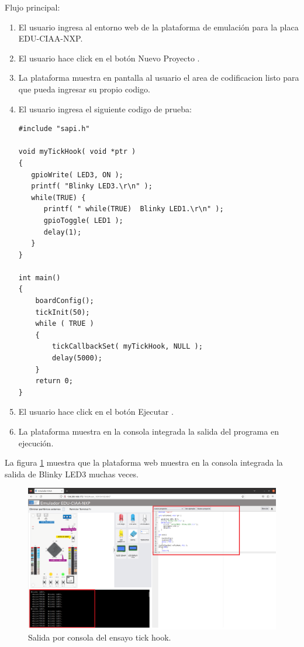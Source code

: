 Flujo principal:
\begin{enumerate}
	\item El usuario ingresa al entorno web de la plataforma de emulación para la placa EDU-CIAA-NXP.
	\item El usuario hace click en el botón \textquotedbl Nuevo Proyecto \textquotedbl.
	\item La plataforma muestra en pantalla al usuario el area de codificacion listo para que pueda ingresar su propio codigo.
	\item El usuario ingresa el siguiente codigo de prueba:
	
\begin{lstlisting}[caption={nuevo proyecto}]
#include "sapi.h"

void myTickHook( void *ptr )
{
   gpioWrite( LED3, ON );
   printf( "Blinky LED3.\r\n" );
   while(TRUE) {
      printf( " while(TRUE)  Blinky LED1.\r\n" );
      gpioToggle( LED1 );
      delay(1);
   }
}

int main()
{
    boardConfig();
    tickInit(50);
    while ( TRUE )
    {
		tickCallbackSet( myTickHook, NULL );
		delay(5000);
    }
    return 0;
}
\end{lstlisting}

	\item El usuario hace click en el botón \textquotedbl Ejecutar \textquotedbl.
	\item La plataforma muestra en la consola integrada la salida del programa en ejecución.
	
\end{enumerate}
	

La figura \ref{fig:Testtickhook} muestra que la plataforma web muestra en la consola integrada la salida de \textquotedbl Blinky LED3 \textquotedbl muchas veces. 

\hfill \break
\hfill \break
\hfill \break
\hfill \break
\hfill \break
\hfill \break
\hfill \break
\hfill \break
\hfill \break
\hfill \break
\hfill \break

\begin{figure}[ht]
	\centering
	\includegraphics[scale=.25]{./Figures/Testtickhook.png}
	\caption{Salida por consola del ensayo tick hook.}
	\label{fig:Testtickhook}
\end{figure}

